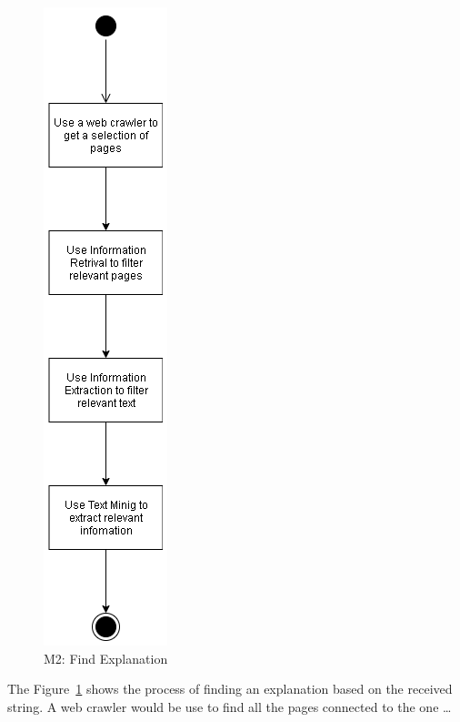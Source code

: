 \begin{figure}[H]
\centering
\includegraphics[scale=0.5]{ch4/assets/M2.png}
\caption[Find Explanation Module]{M2: Find Explanation}
\label{fig:M2}
\end{figure}

The Figure~\ref{fig:M2} shows the process of finding an explanation based on the received string.
A web crawler would be use to find all the pages connected to the one \dots

